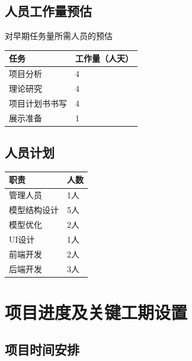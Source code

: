 \documentclass[
  hyperref, a4paper]{ctexart}
\begin{document}
\hypertarget{ux4ebaux5458ux5de5ux4f5cux91cfux9884ux4f30}{%
\subsection{人员工作量预估}\label{ux4ebaux5458ux5de5ux4f5cux91cfux9884ux4f30}}

对早期任务量所需人员的预估

\begin{longtable}[]{@{}ll@{}}
\toprule
任务 & 工作量（人天）\tabularnewline
\midrule
\endhead
项目分析 & 4\tabularnewline
理论研究 & 4\tabularnewline
项目计划书书写 & 4\tabularnewline
展示准备 & 1\tabularnewline
\bottomrule
\end{longtable}

\hypertarget{ux4ebaux5458ux8ba1ux5212}{%
\subsection{人员计划}\label{ux4ebaux5458ux8ba1ux5212}}

\begin{longtable}[]{@{}ll@{}}
\toprule
职责 & 人数\tabularnewline
\midrule
\endhead
管理人员 & 1人\tabularnewline
模型结构设计 & 5人\tabularnewline
模型优化 & 2人\tabularnewline
UI设计 & 1人\tabularnewline
前端开发 & 2人\tabularnewline
后端开发 & 3人\tabularnewline
\bottomrule
\end{longtable}

\hypertarget{ux9879ux76eeux8fdbux5ea6ux53caux5173ux952eux5de5ux671fux8bbeux7f6e}{%
\section{项目进度及关键工期设置}\label{ux9879ux76eeux8fdbux5ea6ux53caux5173ux952eux5de5ux671fux8bbeux7f6e}}

\hypertarget{ux9879ux76eeux65f6ux95f4ux5b89ux6392}{%
\subsection{项目时间安排}\label{ux9879ux76eeux65f6ux95f4ux5b89ux6392}}
\end{document}
